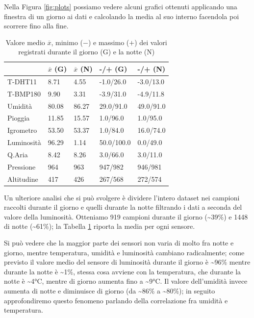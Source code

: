 \documentclass[fleqn, 10pt]{SelfArx}
\begin{document}
Nella Figura \ref{fig:plots} possiamo vedere alcuni grafici ottenuti applicando una finestra di un giorno ai dati e calcolando la media al suo interno facendola poi scorrere fino alla fine.

\begin{table}[htb]
  \centering
  \small
  \begin{tabular}{ l l l l l }
    \hline
    & $\overline{x}$ (G) & $\overline{x}$ (N) & -/+ (G) & -/+ (N) \\
    \hline
    T-DHT11 & 8.71 & 4.55 & -1.0/26.0 & -3.0/13.0 \\
    T-BMP180 & 9.90 & 3.31 & -3.9/31.0 & -4.9/11.8 \\
    Umidità & 80.08 & 86.27 & 29.0/91.0 & 49.0/91.0 \\
    Pioggia & 11.85 & 15.57 & 1.0/96.0 & 1.0/95.0 \\
    Igrometro & 53.50 & 53.37 & 1.0/84.0 & 16.0/74.0 \\
    Luminosità & 96.29 & 1.14 & 50.0/100.0 & 0.0/49.0 \\
    Q.Aria & 8.42 & 8.26 & 3.0/66.0 & 3.0/11.0 \\
    Pressione & 964 & 963 & 947/982 & 946/981 \\
    Altitudine & 417 & 426 & 267/568 & 272/574 \\
    \hline
  \end{tabular}
  \caption{Valore medio $\overline{x}$, minimo ($-$) e massimo ($+$) dei valori registrati durante il giorno (G) e la notte (N)}
  \label{tab:daynight}
\end{table}

Un ulteriore analisi che si può svolgere è dividere l'intero dataset nei campioni raccolti durante il giorno e quelli durante la notte filtrando i dati a seconda del valore della luminosità. 
Otteniamo 919 campioni durante il giorno (\textasciitilde39\%) e 1448 di notte (\textasciitilde61\%); la Tabella \ref{tab:daynight} riporta la media per ogni sensore.

Si può vedere che la maggior parte dei sensori non varia di molto fra notte e giorno, mentre temperatura, umidità e luminosità cambiano radicalmente; come previsto il valore medio 
del sensore di luminosità durante il giorno è \textasciitilde96\% mentre durante la notte è \textasciitilde1\%, stessa cosa avviene con la temperatura, che durante la notte è \textasciitilde4°C, mentre di 
giorno aumenta fino a \textasciitilde9°C. Il valore dell'umidità invece aumenta di notte e diminuisce di giorno (da \textasciitilde86\% a \textasciitilde80\%); in seguito approfondiremo questo fenomeno parlando 
della correlazione fra umidità e temperatura.
\end{document}
